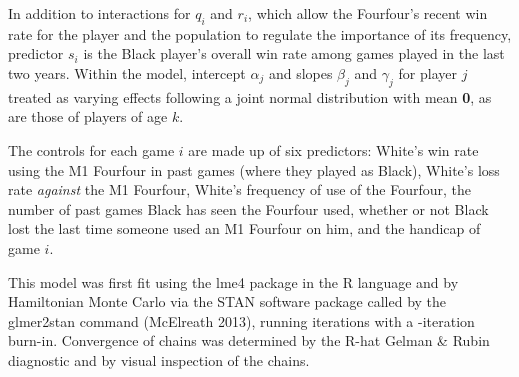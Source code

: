\documentclass[reqno,12pt]{amsart}
\begin{document}
In addition to interactions for $q_i$ and $r_i$, which allow the Fourfour's recent win rate for the player and the population to regulate the importance of its frequency, predictor $s_i$ is the Black player's overall win rate among games played in the last two years. Within the model, intercept $\alpha_j$ and slopes $\beta_j$ and $\gamma_j$ for player $j$ treated as varying effects following a joint normal distribution with mean \textbf{0}, as are those of players of age $k$.

The controls for each game $i$ are made up of six predictors: White's win rate using the M1 Fourfour in past games (where they played as Black), White's loss rate \textit{against} the M1 Fourfour, White's frequency of use of the Fourfour, the number of past games Black has seen the Fourfour used, whether or not Black lost the last time someone used an M1 Fourfour on him, and the handicap of game $i$.

This model was first fit using the lme4 package in the R language and by Hamiltonian Monte Carlo via the STAN software package called by the glmer2stan command (McElreath 2013), running \nIterations{} iterations with a \nBurnIn-iteration burn-in. Convergence of chains was determined by the R-hat Gelman \& Rubin diagnostic \citep{stan2013stan} and by visual inspection of the chains.
\end{document}
